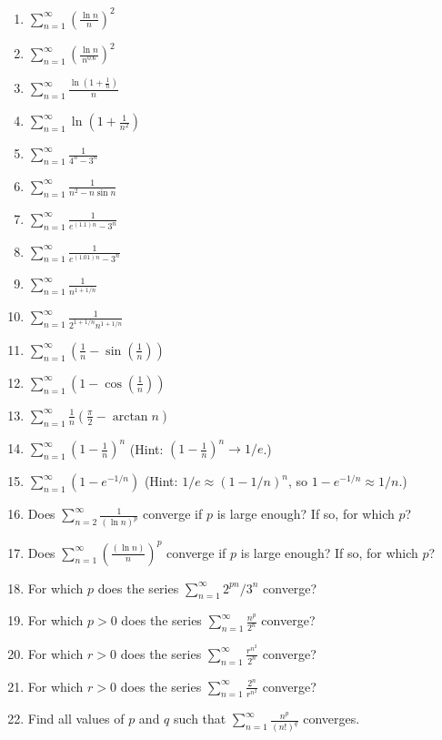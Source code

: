 \documentclass{exercises}
\begin{document}
\begin{enumerate}[resume]
\item $\sum_{n=1}^{\infty}\left(\frac{\ln n}{n}\right)^{2}$
\item $\sum_{n=1}^{\infty}\left(\frac{\ln n}{n^{0.6}}\right)^{2}$
\item $\sum_{n=1}^{\infty}\frac{\ln(1+\frac{1}{n})}{n}$
\item $\sum_{n=1}^{\infty}\ln(1+\frac{1}{n^{2}})$
\item $\sum_{n=1}^{\infty}\frac{1}{4^{n}-3^{n}}$
\item $\sum_{n=1}^{\infty}\frac{1}{n^{2}-n\sin n}$
\item $\sum_{n=1}^{\infty}\frac{1}{e^{(1.1)n}-3^{n}}$
\item $\sum_{n=1}^{\infty}\frac{1}{e^{(1.01)n}-3^{n}}$
\item $\sum_{n=1}^{\infty}\frac{1}{n^{1+1/n}}$
\item $\sum_{n=1}^{\infty}\frac{1}{2^{1+1/n}n^{1+1/n}}$
\item $\sum_{n=1}^{\infty}\left(\frac{1}{n}-\sin\left(\frac{1}{n}\right)\right)$
\item $\sum_{n=1}^{\infty}\left(1-\cos\left(\frac{1}{n}\right)\right)$
\item $\sum_{n=1}^{\infty}\frac{1}{n}\left(\frac{\pi}{2}-\arctan n\right)$
\item $\sum_{n=1}^{\infty}\left(1-\frac{1}{n}\right)^{n}$ (Hint: $\left(1-\frac{1}{n}\right)^{n}\to 1/e$.)
\item $\sum_{n=1}^{\infty}(1-e^{-1/n})$ (Hint: $1/e\approx(1-1/n)^{n}$, so $1-e^{-1/n}\approx 1/n$.)
\item Does $\sum_{n=2}^{\infty}\frac{1}{{(\ln n)}^{p}}$ converge if $p$ is large enough? If so, for which $p$?
\item Does $\sum_{n=1}^{\infty}{(\frac{(\ln n)}{n})}^{p}$ converge if $p$ is large enough? If so, for which $p$?
\item For which $p$ does the series $\sum_{n=1}^{\infty}2^{pn}/3^{n}$ converge?
\item For which $p>0$ does the series $\sum_{n=1}^{\infty}\frac{n^{p}}{2^{n}}$ converge?
\item For which $r>0$ does the series $\sum_{n=1}^{\infty}\frac{r^{n^{2}}}{2^{n}}$ converge?
\item For which $r>0$ does the series $\sum_{n=1}^{\infty}\frac{2^{n}}{r^{n^{2}}}$ converge?
\item Find all values of $p$ and $q$ such that $\sum_{n=1}^{\infty}\frac{n^{p}}{{(n!)}^{q}}$ converges.

\end{enumerate}
\end{document}
